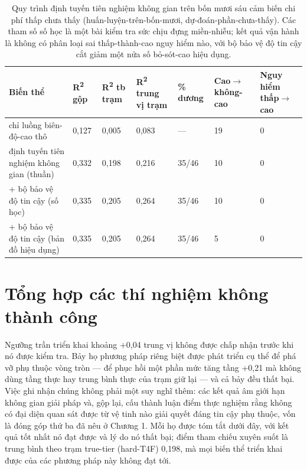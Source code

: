 {\small
\begin{longtable}{lllllll}
\caption{Quy trình định tuyến tiên nghiệm không gian trên bốn mươi sáu cảm biến chi phí thấp chưa thấy (huấn-luyện-trên-bốn-mươi, dự-đoán-phần-chưa-thấy). Các tham số số học là một bài kiểm tra sức chịu đựng miền-nhiễu; kết quả vận hành là không có phân loại sai thấp-thành-cao nguy hiểm nào, với bộ bảo vệ độ tin cậy cắt giảm một nửa số bỏ-sót-cao hiệu dụng.}\\
\toprule
\textbf{Biến thể} & \textbf{R\textsuperscript{2} gộp} & \textbf{R\textsuperscript{2} tb trạm} & \textbf{R\textsuperscript{2} trung vị trạm} & \textbf{\% dương} & \textbf{Cao$\rightarrow$không-cao} & \textbf{Nguy hiểm thấp$\rightarrow$cao} \\
\midrule\endhead
chỉ luồng biên-độ-cao thô & 0,127 & 0,005 & 0,083 & --- & 19 & 0 \\
định tuyến tiên nghiệm không gian (thuần) & 0,332 & 0,198 & 0,216 & 35/46 & 10 & 0 \\
+ bộ bảo vệ độ tin cậy (số học) & 0,335 & 0,205 & 0,264 & 35/46 & 10 & 0 \\
+ bộ bảo vệ độ tin cậy (bản đồ hiệu dụng) & 0,335 & 0,205 & 0,264 & 35/46 & 5 & 0 \\
\bottomrule
\end{longtable}
}


\section{Tổng hợp các thí nghiệm không thành công}

Ngưỡng trần triển khai khoảng +0,04 trung vị không được chấp nhận trước khi nó được kiểm tra. Bảy họ phương pháp riêng biệt được phát triển cụ thể để phá vỡ phụ thuộc vòng tròn --- để phục hồi một phần mức tăng tầng +0,21 mà không dùng tầng thực hay trung bình thực của trạm giữ lại --- và cả bảy đều thất bại. Việc ghi nhận chúng không phải một suy nghĩ thêm: các kết quả âm giới hạn không gian giải pháp và, gộp lại, cấu thành luận điểm thực nghiệm rằng không có đại diện quan sát được từ vệ tinh nào giải quyết đáng tin cậy phụ thuộc, vốn là đóng góp thứ ba đã nêu ở Chương 1. Mỗi họ được tóm tắt dưới đây, với kết quả tốt nhất nó đạt được và lý do nó thất bại; điểm tham chiếu xuyên suốt là trung bình theo trạm true-tier (hard-T4F) 0,198, mà mọi biến thể triển khai được của các phương pháp này không đạt tới.

